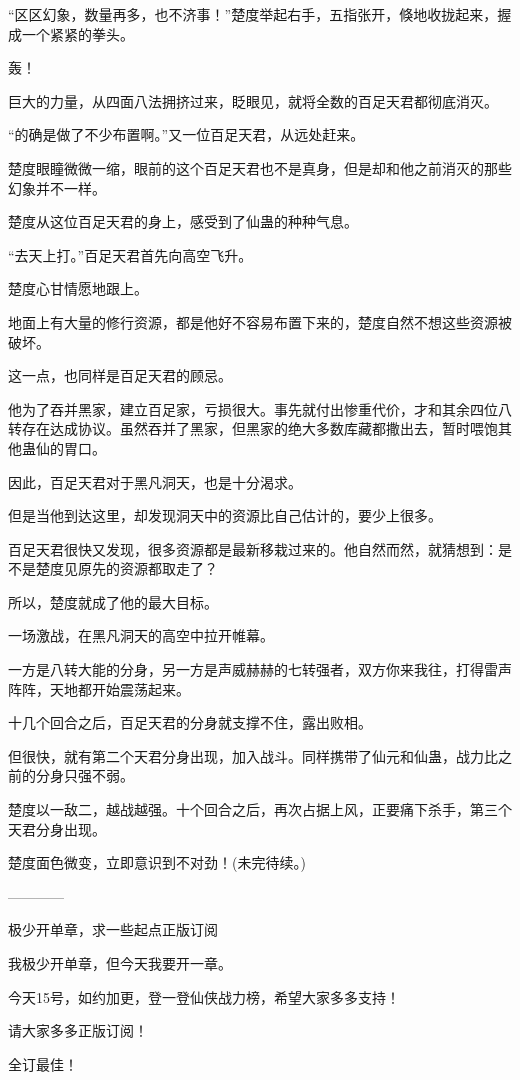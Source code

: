 \begin{this_body}
“区区幻象，数量再多，也不济事！”楚度举起右手，五指张开，倏地收拢起来，握成一个紧紧的拳头。

轰！

巨大的力量，从四面八法拥挤过来，眨眼见，就将全数的百足天君都彻底消灭。

“的确是做了不少布置啊。”又一位百足天君，从远处赶来。

楚度眼瞳微微一缩，眼前的这个百足天君也不是真身，但是却和他之前消灭的那些幻象并不一样。

楚度从这位百足天君的身上，感受到了仙蛊的种种气息。

“去天上打。”百足天君首先向高空飞升。

楚度心甘情愿地跟上。

地面上有大量的修行资源，都是他好不容易布置下来的，楚度自然不想这些资源被破坏。

这一点，也同样是百足天君的顾忌。

他为了吞并黑家，建立百足家，亏损很大。事先就付出惨重代价，才和其余四位八转存在达成协议。虽然吞并了黑家，但黑家的绝大多数库藏都撒出去，暂时喂饱其他蛊仙的胃口。

因此，百足天君对于黑凡洞天，也是十分渴求。

但是当他到达这里，却发现洞天中的资源比自己估计的，要少上很多。

百足天君很快又发现，很多资源都是最新移栽过来的。他自然而然，就猜想到：是不是楚度见原先的资源都取走了？

所以，楚度就成了他的最大目标。

一场激战，在黑凡洞天的高空中拉开帷幕。

一方是八转大能的分身，另一方是声威赫赫的七转强者，双方你来我往，打得雷声阵阵，天地都开始震荡起来。

十几个回合之后，百足天君的分身就支撑不住，露出败相。

但很快，就有第二个天君分身出现，加入战斗。同样携带了仙元和仙蛊，战力比之前的分身只强不弱。

楚度以一敌二，越战越强。十个回合之后，再次占据上风，正要痛下杀手，第三个天君分身出现。

楚度面色微变，立即意识到不对劲！(未完待续。)

------------

极少开单章，求一些起点正版订阅

我极少开单章，但今天我要开一章。

今天15号，如约加更，登一登仙侠战力榜，希望大家多多支持！

请大家多多正版订阅！

全订最佳！


\end{this_body}

